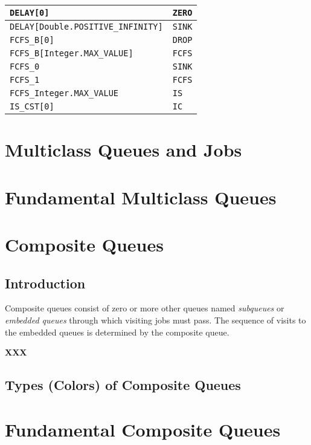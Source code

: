 \documentclass[12pt]{book}
\begin{document}
\begin{tabular}{|l|l|}
\hline
\lstinline|DELAY[0]| & \lstinline|ZERO| \\
\hline
\lstinline|DELAY[Double.POSITIVE_INFINITY]| & \lstinline|SINK| \\
\hline
\lstinline|FCFS_B[0]| & \lstinline|DROP| \\
\hline
\lstinline|FCFS_B[Integer.MAX_VALUE]| & \lstinline|FCFS| \\
\hline
\lstinline|FCFS_0| & \lstinline|SINK| \\
\hline
\lstinline|FCFS_1| & \lstinline|FCFS| \\
\hline
\lstinline|FCFS_Integer.MAX_VALUE| & \lstinline|IS| \\
\hline
\lstinline|IS_CST[0]| & \lstinline|IC| \\
\hline
\end{tabular}

\chapter{Multiclass Queues and Jobs}

\chapter{Fundamental Multiclass Queues}

\chapter{Composite Queues}

\section{Introduction}

Composite queues consist of zero or more other queues
  named {\em subqueues\/} or {\em embedded queues\/}
  through which visiting jobs must pass.
The sequence of visits to the embedded queues is
  determined by the composite queue.

{\bf XXX}

\section{Types (Colors) of Composite Queues}

\chapter{Fundamental Composite Queues}
\end{document}
